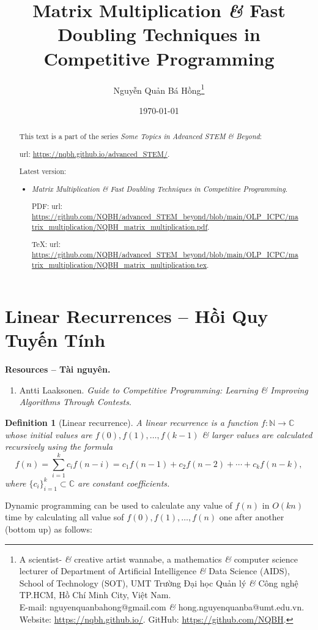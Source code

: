 \documentclass{article}
\title{Matrix Multiplication {\it\&} Fast Doubling Techniques in Competitive Programming}
\author{Nguyễn Quản Bá Hồng\footnote{A scientist- {\it\&} creative artist wannabe, a mathematics {\it\&} computer science lecturer of Department of Artificial Intelligence {\it\&} Data Science (AIDS), School of Technology (SOT), UMT Trường Đại học Quản lý {\it\&} Công nghệ TP.HCM, Hồ Chí Minh City, Việt Nam.\\E-mail: {\sf nguyenquanbahong@gmail.com} {\it\&} {\sf hong.nguyenquanba@umt.edu.vn}. Website: \url{https://nqbh.github.io/}. GitHub: \url{https://github.com/NQBH}.}}
\date{\today}
\newtheorem{definition}{Definition}
\begin{document}
\maketitle
\begin{abstract}
    This text is a part of the series {\it Some Topics in Advanced STEM \& Beyond}:

    {\sc url}: \url{https://nqbh.github.io/advanced_STEM/}.

    Latest version:
    \begin{itemize}
        \item {\it Matrix Multiplication \& Fast Doubling Techniques in Competitive Programming}.

        PDF: {\sc url}: \url{https://github.com/NQBH/advanced_STEM_beyond/blob/main/OLP_ICPC/matrix_multiplication/NQBH_matrix_multiplication.pdf}.

        \TeX: {\sc url}: \url{https://github.com/NQBH/advanced_STEM_beyond/blob/main/OLP_ICPC/matrix_multiplication/NQBH_matrix_multiplication.tex}.
    \end{itemize}
\end{abstract}
\tableofcontents


\section{Linear Recurrences -- Hồi Quy Tuyến Tính}
\textbf{\textsf{Resources -- Tài nguyên.}}
\begin{enumerate}
    \item \cite{Laaksonen2024} {\sc Antti Laaksonen}. {\it Guide to Competitive Programming: Learning \& Improving Algorithms Through Contests}.
\end{enumerate}

\begin{definition}[Linear recurrence]
    A {\rm linear recurrence} is a function $f:\mathbb{N}\to\mathbb{C}$ whose initial values are $f(0),f(1),\ldots,f(k - 1)$ \& larger values are calculated recursively using the formula
    \begin{equation}
        \label{linear recurrence}
        f(n) = \sum_{i=1}^k c_if(n - i) = c_1f(n - 1) + c_2f(n - 2) + \cdots + c_kf(n - k),
    \end{equation}
    where $\{c_i\}_{i=1}^k\subset\mathbb{C}$ are constant coefficients.
\end{definition}
Dynamic programming can be used to calculate any value of $f(n)$ in $O(kn)$ time by calculating all value sof $f(0),f(1),\ldots,f(n)$ one after another (bottom up) as follows:
\end{document}
